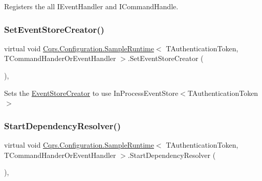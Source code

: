 Registers the all I\+Event\+Handler and I\+Command\+Handle. 

\mbox{\label{classCqrs_1_1Configuration_1_1SampleRuntime_a08ac580aad6ab03f16fd3171f21dfe59_a08ac580aad6ab03f16fd3171f21dfe59}} 
\subsubsection{\texorpdfstring{Set\+Event\+Store\+Creator()}{SetEventStoreCreator()}}
{\footnotesize\ttfamily virtual void \hyperlink{classCqrs_1_1Configuration_1_1SampleRuntime}{Cqrs.\+Configuration.\+Sample\+Runtime}$<$ T\+Authentication\+Token, T\+Command\+Hander\+Or\+Event\+Handler $>$.Set\+Event\+Store\+Creator (\begin{DoxyParamCaption}{ }\end{DoxyParamCaption})\hspace{0.3cm}{\ttfamily [protected]}, {\ttfamily [virtual]}}



Sets the \hyperlink{classCqrs_1_1Configuration_1_1SampleRuntime_a9038dd478bcafb2f5f65cbcbada712db_a9038dd478bcafb2f5f65cbcbada712db}{Event\+Store\+Creator} to use In\+Process\+Event\+Store$<$\+T\+Authentication\+Token$>$ 

\mbox{\label{classCqrs_1_1Configuration_1_1SampleRuntime_a1593df9e75becc36fee1f15b2be14ec4_a1593df9e75becc36fee1f15b2be14ec4}} 
\subsubsection{\texorpdfstring{Start\+Dependency\+Resolver()}{StartDependencyResolver()}}
{\footnotesize\ttfamily virtual void \hyperlink{classCqrs_1_1Configuration_1_1SampleRuntime}{Cqrs.\+Configuration.\+Sample\+Runtime}$<$ T\+Authentication\+Token, T\+Command\+Hander\+Or\+Event\+Handler $>$.Start\+Dependency\+Resolver (\begin{DoxyParamCaption}{ }\end{DoxyParamCaption})\hspace{0.3cm}{\ttfamily [protected]}, {\ttfamily [virtual]}}



